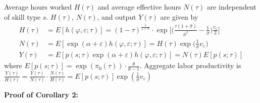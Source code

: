 \documentclass{article}
\begin{document}
{
\corollary Average hours worked $H(\tau)$ and average effective hours $N(\tau)$ are independent of skill type $s$. $H(\tau)$, $N(\tau)$, and output $Y(\tau)$ are given by
\begin{align}
H(\tau) &= E[h(\varphi, \varepsilon; \tau)] = (1-\tau)^{\frac{1}{1+\sigma}} \cdot \exp\Bigg[\Bigg(\frac{\tau(1+\hat \sigma)}{\hat \sigma^2} - \frac{1}{\hat\sigma}\Bigg)\frac{v_\varepsilon}{2}\Bigg] \label{cor2_h}\\
N(\tau) &= E[\exp(\alpha + \varepsilon) h(\varphi, \varepsilon; \tau)] = H(\tau) \exp\Bigg(\frac{1}{\hat\sigma} v_\varepsilon\Bigg) \label{cor2_n}\\
Y(\tau) &= E[p(s; \tau) \exp(\alpha + \varepsilon) h(\varphi, \varepsilon; \tau)] = N(\tau) E[p(s; \tau) ]\label{cor2_y}
\end{align}
where $E[p(s; \tau)] = \exp(\pi_0(\tau)) \cdot \frac{\theta}{\theta - 1}$. Aggregate labor productivity is 
$\frac{Y(\tau)}{H(\tau)} = \frac{Y(\tau)}{N(\tau)} \cdot \frac{N(\tau)}{H(\tau)} = E[p(s; \tau) ]\exp(\frac{1}{\hat\sigma} v_\varepsilon)$
}

\pagebreak

\textbf{Proof of Corollary 2:}
\end{document}
